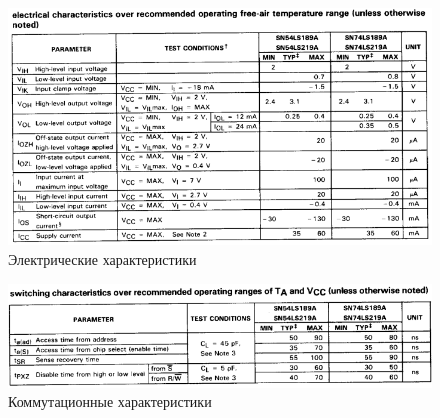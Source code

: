 \begin{figure}[H]
	\centering
	\includegraphics[width=0.95\linewidth]{imgs/16/16_ch}
	\caption{Электрические характеристики}
	\label{fig:16_ch}
\end{figure}

\begin{figure}[H]
	\centering
	\includegraphics[width=0.95\linewidth]{imgs/16/16_switch}
	\caption{Коммутационные характеристики}
	\label{fig:16_switch}
\end{figure}
